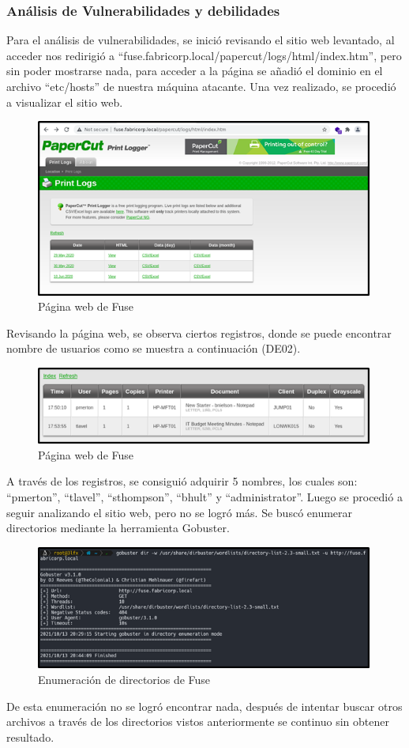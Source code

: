 \subsubsection{Análisis de Vulnerabilidades y debilidades}
Para el análisis de vulnerabilidades, se inició revisando el sitio web levantado, al acceder nos redirigió a “fuse.fabricorp.local/papercut/logs/html/index.htm”, pero sin poder mostrarse nada, para acceder a la página se añadió el dominio en el archivo “etc/hosts” de nuestra máquina atacante. Una vez realizado, se procedió a visualizar el sitio web.
\begin{figure}[H]
    \centering
    \includegraphics[width=0.99\textwidth]{imagenes/pagfuse.png}
    \caption{Página web de Fuse}
\end{figure}
Revisando la página web, se observa ciertos registros, donde se puede encontrar nombre de usuarios como se muestra a continuación (DE02).
\begin{figure}[H]
    \centering
    \includegraphics[width=0.99\textwidth]{imagenes/regsfuse.png}
    \caption{Página web de Fuse}
\end{figure}
A través de los registros, se consiguió adquirir 5 nombres, los cuales son: “pmerton”, “tlavel”, “sthompson”, “bhult” y “administrator”. Luego se procedió a seguir analizando el sitio web, pero no se logró más. Se buscó enumerar directorios mediante la herramienta Gobuster.
\begin{figure}[H]
    \centering
    \includegraphics[width=0.99\textwidth]{imagenes/enudicfuse.png}
    \caption{Enumeración de directorios de Fuse}
\end{figure}
De esta enumeración no se logró encontrar nada, después de intentar buscar otros archivos a través de los directorios vistos anteriormente se continuo sin obtener resultado.

